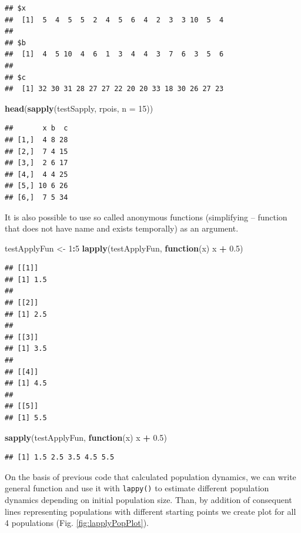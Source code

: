 \documentclass[]{book}
\newenvironment{Shaded}{\begin{snugshade}}{\end{snugshade}}
\newcommand{\KeywordTok}[1]{\textcolor[rgb]{0.13,0.29,0.53}{\textbf{#1}}}
\newcommand{\DataTypeTok}[1]{\textcolor[rgb]{0.13,0.29,0.53}{#1}}
\newcommand{\DecValTok}[1]{\textcolor[rgb]{0.00,0.00,0.81}{#1}}
\newcommand{\FloatTok}[1]{\textcolor[rgb]{0.00,0.00,0.81}{#1}}
\newcommand{\StringTok}[1]{\textcolor[rgb]{0.31,0.60,0.02}{#1}}
\newcommand{\ControlFlowTok}[1]{\textcolor[rgb]{0.13,0.29,0.53}{\textbf{#1}}}
\newcommand{\OperatorTok}[1]{\textcolor[rgb]{0.81,0.36,0.00}{\textbf{#1}}}
\newcommand{\NormalTok}[1]{#1}
\theoremstyle{definition}
\theoremstyle{definition}
\theoremstyle{definition}
\theoremstyle{remark}
\begin{document}
\begin{verbatim}
## $x
##  [1]  5  4  5  5  2  4  5  6  4  2  3  3 10  5  4
## 
## $b
##  [1]  4  5 10  4  6  1  3  4  4  3  7  6  3  5  6
## 
## $c
##  [1] 32 30 31 28 27 27 22 20 20 33 18 30 26 27 23
\end{verbatim}

\begin{Shaded}
\begin{Highlighting}[]
\KeywordTok{head}\NormalTok{(}\KeywordTok{sapply}\NormalTok{(testSapply, rpois, }\DataTypeTok{n =} \DecValTok{15}\NormalTok{))}
\end{Highlighting}
\end{Shaded}

\begin{verbatim}
##       x b  c
## [1,]  4 8 28
## [2,]  7 4 15
## [3,]  2 6 17
## [4,]  4 4 25
## [5,] 10 6 26
## [6,]  7 5 34
\end{verbatim}

It is also possible to use so called anonymous functions (simplifying --
function that does not have name and exists temporally) as an argument.

\begin{Shaded}
\begin{Highlighting}[]
\NormalTok{testApplyFun <-}\StringTok{ }\DecValTok{1}\OperatorTok{:}\DecValTok{5}
\KeywordTok{lapply}\NormalTok{(testApplyFun, }\ControlFlowTok{function}\NormalTok{(x) x }\OperatorTok{+}\StringTok{ }\FloatTok{0.5}\NormalTok{)}
\end{Highlighting}
\end{Shaded}

\begin{verbatim}
## [[1]]
## [1] 1.5
## 
## [[2]]
## [1] 2.5
## 
## [[3]]
## [1] 3.5
## 
## [[4]]
## [1] 4.5
## 
## [[5]]
## [1] 5.5
\end{verbatim}

\begin{Shaded}
\begin{Highlighting}[]
\KeywordTok{sapply}\NormalTok{(testApplyFun, }\ControlFlowTok{function}\NormalTok{(x) x }\OperatorTok{+}\StringTok{ }\FloatTok{0.5}\NormalTok{)}
\end{Highlighting}
\end{Shaded}

\begin{verbatim}
## [1] 1.5 2.5 3.5 4.5 5.5
\end{verbatim}

On the basis of previous code that calculated population dynamics, we
can write general function and use it with \texttt{lappy()} to estimate
different population dynamics depending on initial population size.
Than, by addition of consequent lines representing populations with
different starting points we create plot for all 4 populations (Fig.
\ref{fig:lapplyPopPlot}).
\end{document}
